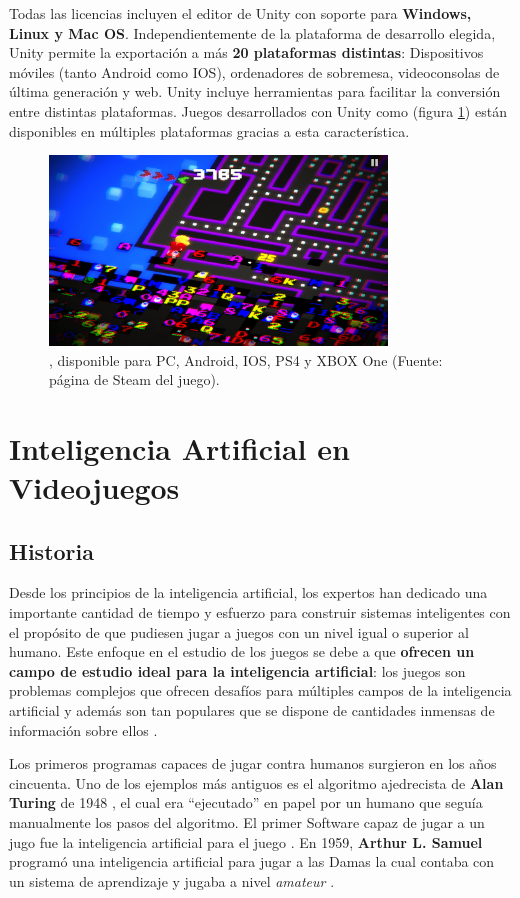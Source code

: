 Todas las licencias incluyen el editor de Unity con soporte para \textbf{Windows, Linux y Mac OS}. Independientemente de la plataforma de desarrollo elegida, Unity permite la exportación a más \textbf{20 plataformas distintas}: Dispositivos móviles (tanto Android como IOS), ordenadores de sobremesa, videoconsolas de última generación y web. Unity incluye herramientas para facilitar la conversión entre distintas plataformas. Juegos desarrollados con Unity como  (figura \ref{pacman-256}) están disponibles en múltiples plataformas gracias a esta característica.
\begin{figure}[h]
	\includegraphics[width=0.8\textwidth]{images/estadodelarte/motores/pacman-256}
	\centering
	\caption{, disponible para PC, Android, IOS, PS4 y XBOX One (Fuente: página de Steam del juego).}
	\label{pacman-256}
\end{figure}

\section{Inteligencia Artificial en Videojuegos}
\subsection{Historia}
Desde los principios de la inteligencia artificial, los expertos han dedicado una importante cantidad de tiempo y esfuerzo para construir sistemas inteligentes con el propósito de que pudiesen jugar a juegos con un nivel igual o superior al humano. Este enfoque en el estudio de los juegos se debe a que \textbf{ofrecen un campo de estudio ideal para la inteligencia artificial}: los juegos son problemas complejos que ofrecen desafíos para múltiples campos de la inteligencia artificial y además son tan populares que se dispone de cantidades inmensas de información sobre ellos \cite{ai_and_games}.

Los primeros programas capaces de jugar contra humanos surgieron en los años cincuenta. Uno de los ejemplos más antiguos es el algoritmo ajedrecista de \textbf{Alan Turing} de 1948 \cite{turing_chess}, el cual era ``ejecutado'' en papel por un humano que seguía manualmente los pasos del algoritmo. El primer Software capaz de jugar a un jugo fue la inteligencia artificial para el juego . En 1959, \textbf{Arthur L. Samuel} \cite{machine_learning} programó una inteligencia artificial para jugar a las Damas la cual contaba con un sistema de aprendizaje y jugaba a nivel \textit{amateur} \cite{ia_moderno}. 

